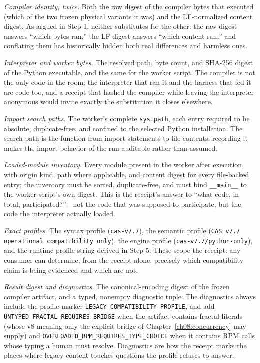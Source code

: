 \emph{Compiler identity, twice.} Both the raw digest of the compiler bytes that executed (which of the two frozen physical variants it was) and the LF-normalized content digest. As argued in Step 1, neither substitutes for the other: the raw digest answers ``which bytes ran,'' the LF digest answers ``which content ran,'' and conflating them has historically hidden both real differences and harmless ones.

\emph{Interpreter and worker bytes.} The resolved path, byte count, and SHA-256 digest of the Python executable, and the same for the worker script. The compiler is not the only code in the room; the interpreter that ran it and the harness that fed it are code too, and a receipt that hashed the compiler while leaving the interpreter anonymous would invite exactly the substitution it closes elsewhere.

\emph{Import search paths.} The worker's complete \texttt{sys.path}, each entry required to be absolute, duplicate-free, and confined to the selected Python installation. The search path is the function from import statements to file contents; recording it makes the import behavior of the run auditable rather than assumed.

\emph{Loaded-module inventory.} Every module present in the worker after execution, with origin kind, path where applicable, and content digest for every file-backed entry; the inventory must be sorted, duplicate-free, and must bind \texttt{\_\_main\_\_} to the worker script's own digest. This is the receipt's answer to ``what code, in total, participated?''---not the code that was supposed to participate, but the code the interpreter actually loaded.

\emph{Exact profiles.} The syntax profile (\texttt{cas-v7.7}), the semantic profile (\texttt{CAS v7.7 operational compatibility only}), the engine profile (\texttt{cas-v7.7/python-only}), and the runtime profile string derived in Step 5. These scope the receipt: any consumer can determine, from the receipt alone, precisely which compatibility claim is being evidenced and which are not.

\emph{Result digest and diagnostics.} The canonical-encoding digest of the frozen compiler artifact, and a typed, nonempty diagnostic tuple. The diagnostics always include the profile marker \texttt{LEGACY\_COMPATIBILITY\_PROFILE}, and add \texttt{UNTYPED\_FRACTAL\_REQUIRES\_BRIDGE} when the artifact contains fractal literals (whose v8 meaning only the explicit bridge of Chapter~\ref{ch08:concurrency} may supply) and \texttt{OVERLOADED\_RPM\_REQUIRES\_TYPE\_CHOICE} when it contains RPM calls whose typing a human must resolve. Diagnostics are how the receipt marks the places where legacy content touches questions the profile refuses to answer.

